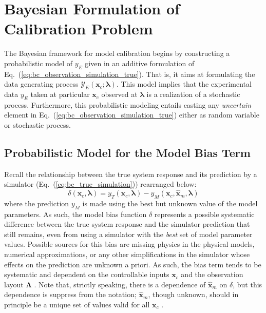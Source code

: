 \section{Bayesian Formulation of Calibration Problem}\label{sec:bc_modular}

The Bayesian framework for model calibration begins by constructing a probabilistic model of $y_E$ given in an additive formulation of Eq.~(\ref{eq:bc_observation_simulation_true}). 
That is, it aims at formulating the data generating process $\mathcal{Y}_E(\bm{x}_c; \bm{\lambda})$.
This model implies that the experimental data $y_E$ taken at particular $\bm{x}_c$ observed at $\bm{\lambda}$ is a realization of a stochastic process.
Furthermore, this probabilistic modeling entails casting any \emph{uncertain} element in Eq.~(\ref{eq:bc_observation_simulation_true}) either as random variable or stochastic process.

\subsection{Probabilistic Model for the Model Bias Term }\label{sub:bc_modular_bias}

Recall the relationship between the true system response and its prediction by a simulator (Eq.~(\ref{eq:bc_true_simulation})) rearranged below:
\begin{equation*}
    \delta (\bm{x}_c, \boldsymbol{\lambda}) = y_T(\bm{x}_c, \boldsymbol{\lambda}) - y_M (\bm{x}_c, \hat{\bm{x}}_m, \boldsymbol{\lambda})
\end{equation*}
where the prediction $y_M$ is made using the best but unknown value of the model parameters.
As such, the model bias function $\delta$ represents a possible systematic difference between the true system response and the simulator prediction that still remains,
even from using a simulator with the \emph{best} set of model parameter values.
Possible sources for this bias are missing physics in the physical models, numerical approximations, or any other simplifications in the simulator whose effects on the prediction are unknown a priori.
As such, the bias term tends to be systematic and dependent on the controllable inputs $\bm{x}_c$ and the observation layout $\boldsymbol{\Lambda}$ \cite{Reichert2012}.
Note that, strictly speaking, there is a dependence of $\hat{\bm{x}}_m$ on $\delta$, but this dependence is suppress from the notation; $\hat{\bm{x}}_m$, though unknown, should in principle be a unique set of values valid for all $\bm{x}_c$ \cite{Bayarri2007,Arendt2012}.

